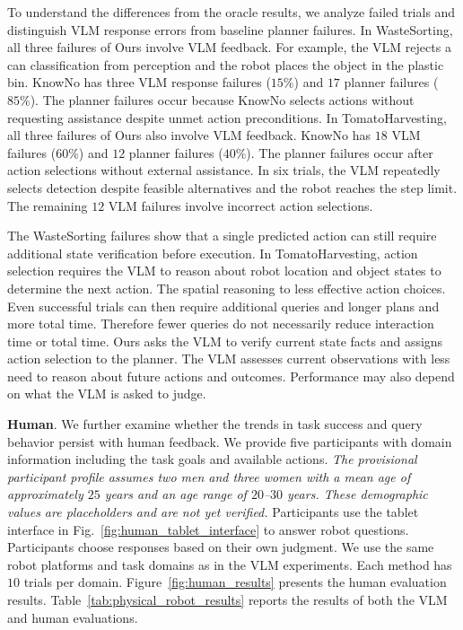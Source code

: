 To understand the differences from the oracle results, we analyze failed trials and distinguish VLM response errors from baseline planner failures. In WasteSorting, all three failures of Ours involve VLM feedback. For example, the VLM rejects a can classification from perception and the robot places the object in the plastic bin. KnowNo has three VLM response failures ($15\%$) and $17$ planner failures ($85\%$). The planner failures occur because KnowNo selects actions without requesting assistance despite unmet action preconditions. In TomatoHarvesting, all three failures of Ours also involve VLM feedback. KnowNo has $18$ VLM failures ($60\%$) and $12$ planner failures ($40\%$). The planner failures occur after action selections without external assistance. In six trials, the VLM repeatedly selects detection despite feasible alternatives and the robot reaches the step limit. The remaining $12$ VLM failures involve incorrect action selections.

The WasteSorting failures show that a single predicted action can still require additional state verification before execution. In TomatoHarvesting, action selection requires the VLM to reason about robot location and object states to determine the next action. The spatial reasoning  to less effective action choices. Even successful trials can then require additional queries and longer plans and more total time. Therefore fewer queries do not necessarily reduce interaction time or total time. Ours asks the VLM to verify current state facts and assigns action selection to the planner. The VLM assesses current observations with less need to reason about future actions and outcomes. Performance may also depend on what the VLM is asked to judge.

\noindent\textbf{Human}\label{exp:human_eval}. We further examine whether the trends in task success and query behavior persist with human feedback. We provide five participants with domain information including the task goals and available actions. \textit{The provisional participant profile assumes two men and three women with a mean age of approximately $25$ years and an age range of $20$--$30$ years. These demographic values are placeholders and are not yet verified.} Participants use the tablet interface in Fig.~\ref{fig:human_tablet_interface} to answer robot questions. Participants choose responses based on their own judgment. We use the same robot platforms and task domains as in the VLM experiments. Each method has $10$ trials per domain. Figure~\ref{fig:human_results} presents the human evaluation results. Table~\ref{tab:physical_robot_results} reports the results of both the VLM and human evaluations.


